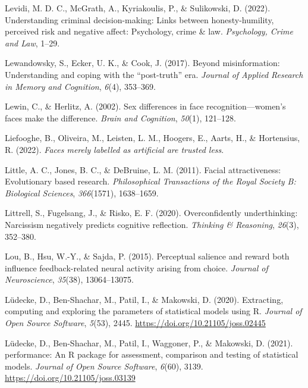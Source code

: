\documentclass[
  man,floatsintext]{apa6}
\newlength{\cslhangindent}
\newlength{\cslentryspacingunit} %
\newenvironment{CSLReferences}[2] %
 {%
  \setlength{\parindent}{0pt}
  \ifodd #1
  \let\oldpar\par
  \def\par{\hangindent=\cslhangindent\oldpar}
  \fi
  \setlength{\parskip}{#2\cslentryspacingunit}
 }%
 {}
\begin{document}
\begin{CSLReferences}{1}{0}
\leavevmode{}%
Levidi, M. D. C., McGrath, A., Kyriakoulis, P., \& Sulikowski, D. (2022). Understanding criminal decision-making: Links between honesty-humility, perceived risk and negative affect: Psychology, crime \& law. \emph{Psychology, Crime and Law}, 1--29.

\leavevmode{}%
Lewandowsky, S., Ecker, U. K., \& Cook, J. (2017). Beyond misinformation: Understanding and coping with the {``post-truth''} era. \emph{Journal of Applied Research in Memory and Cognition}, \emph{6}(4), 353--369.

\leavevmode{}%
Lewin, C., \& Herlitz, A. (2002). Sex differences in face recognition---women's faces make the difference. \emph{Brain and Cognition}, \emph{50}(1), 121--128.

\leavevmode{}%
Liefooghe, B., Oliveira, M., Leisten, L. M., Hoogers, E., Aarts, H., \& Hortensius, R. (2022). \emph{Faces merely labelled as artificial are trusted less}.

\leavevmode{}%
Little, A. C., Jones, B. C., \& DeBruine, L. M. (2011). Facial attractiveness: Evolutionary based research. \emph{Philosophical Transactions of the Royal Society B: Biological Sciences}, \emph{366}(1571), 1638--1659.

\leavevmode{}%
Littrell, S., Fugelsang, J., \& Risko, E. F. (2020). Overconfidently underthinking: Narcissism negatively predicts cognitive reflection. \emph{Thinking \& Reasoning}, \emph{26}(3), 352--380.

\leavevmode{}%
Lou, B., Hsu, W.-Y., \& Sajda, P. (2015). Perceptual salience and reward both influence feedback-related neural activity arising from choice. \emph{Journal of Neuroscience}, \emph{35}(38), 13064--13075.

\leavevmode{}%
Lüdecke, D., Ben-Shachar, M., Patil, I., \& Makowski, D. (2020). Extracting, computing and exploring the parameters of statistical models using {R}. \emph{Journal of Open Source Software}, \emph{5}(53), 2445. \url{https://doi.org/10.21105/joss.02445}

\leavevmode{}%
Lüdecke, D., Ben-Shachar, M., Patil, I., Waggoner, P., \& Makowski, D. (2021). {performance}: An {R} package for assessment, comparison and testing of statistical models. \emph{Journal of Open Source Software}, \emph{6}(60), 3139. \url{https://doi.org/10.21105/joss.03139}


\end{CSLReferences}
\end{document}
